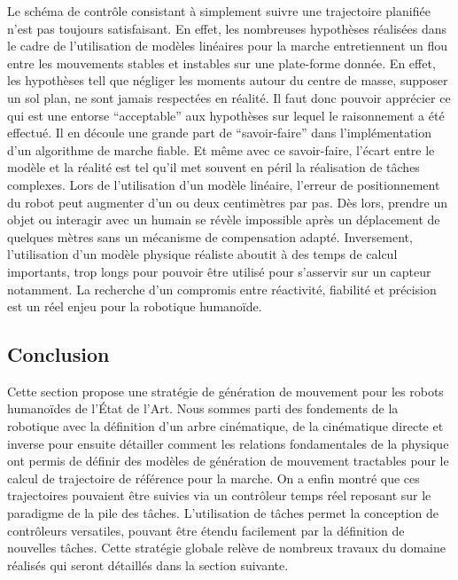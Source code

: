 Le schéma de contrôle consistant à simplement suivre une trajectoire
planifiée n'est pas toujours satisfaisant. En effet, les nombreuses
hypothèses réalisées dans le cadre de l'utilisation de modèles
linéaires pour la marche entretiennent un flou entre les mouvements
stables et instables sur une plate-forme donnée. En effet, les
hypothèses tell que négliger les moments autour du centre de masse,
supposer un sol plan, ne sont jamais respectées en réalité. Il faut
donc pouvoir apprécier ce qui est une entorse ``acceptable'' aux
hypothèses sur lequel le raisonnement a été effectué. Il en découle
une grande part de ``savoir-faire'' dans l'implémentation d'un
algorithme de marche fiable. Et même avec ce savoir-faire, l'écart
entre le modèle et la réalité est tel qu'il met souvent en péril la
réalisation de tâches complexes. Lors de l'utilisation d'un modèle
linéaire, l'erreur de positionnement du robot peut augmenter d'un ou
deux centimètres par pas. Dès lors, prendre un objet ou interagir avec
un humain se révèle impossible après un déplacement de quelques mètres
sans un mécanisme de compensation adapté. Inversement, l'utilisation
d'un modèle physique réaliste aboutit à des temps de calcul
importants, trop longs pour pouvoir être utilisé pour s'asservir sur un
capteur notamment. La recherche d'un compromis entre réactivité,
fiabilité et précision est un réel enjeu pour la robotique humanoïde.


\subsection{Conclusion}

Cette section propose une stratégie de génération de mouvement pour
les robots humanoïdes de l'État de l'Art. Nous sommes parti des
fondements de la robotique avec la définition d'un arbre cinématique,
de la cinématique directe et inverse pour ensuite détailler comment
les relations fondamentales de la physique ont permis de définir des
modèles de génération de mouvement tractables pour le calcul de
trajectoire de référence pour la marche. On a enfin montré que ces
trajectoires pouvaient être suivies via un contrôleur temps réel
reposant sur le paradigme de la pile des tâches. L'utilisation de
tâches permet la conception de contrôleurs versatiles, pouvant être
étendu facilement par la définition de nouvelles tâches. Cette
stratégie globale relève de nombreux travaux du domaine réalisés qui
seront détaillés dans la section suivante.



